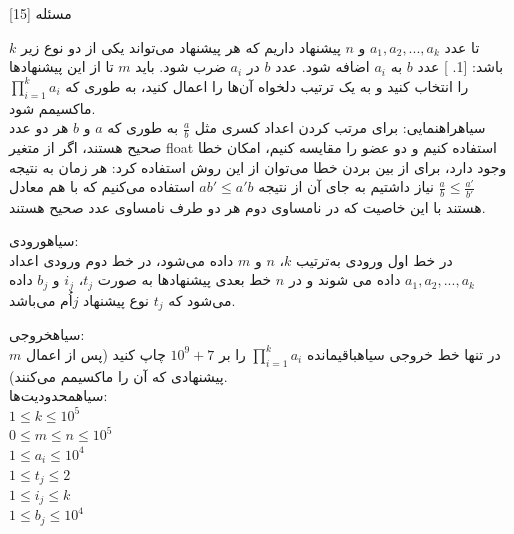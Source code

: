 ‌مسئله [15]

$k$ 
تا عدد $a_1,a_2,...,a_k$ و $n$ پیشنهاد داریم که هر پیشنهاد می‌تواند یکی از دو نوع زیر باشد:
[1. ]
 عدد $b$ به $a_i$ اضافه شود. 
 عدد $b$ در $a_i$ ضرب شود. 
باید
$m$
تا از این پیشنهاد‌ها را انتخاب کنید و به یک ترتیب دلخواه آن‌ها را اعمال کنید، به طوری که
$\prod_{i=1}^{k}a_i$
ماکسیمم شود.\\
‌سیاه{راهنمایی:} برای مرتب کردن اعداد کسری مثل 
$\frac{a}{b}$
به طوری که $a$ و $b$ هر دو عدد صحیح هستند، اگر از متغیر
float
استفاده کنیم و دو عضو را مقایسه کنیم، امکان خطا وجود دارد، برای از بین بردن خطا می‌توان از این روش استفاده کرد: هر زمان به نتیجه 
$\frac{a}{b}\leq \frac{a'}{b'}$
نیاز داشتیم به جای آن از نتیجه 
$ab'\leq a'b$
استفاده می‌کنیم که با هم معادل هستند با این خاصیت که در نامساوی دوم هر دو طرف نامساوی عدد صحیح هستند.

‌سیاه{ورودی:}\\
در خط اول ورودی به‌ترتیب $k$، $n$ و $m$ داده می‌شود، در خط دوم ورودی اعداد $a_1,a_2,...,a_k$ داده می شوند و در $n$ خط بعدی پیشنهادها به صورت 
$t_j$، $i_j$ و $b_j$ 
داده می‌شود که $t_j$ نوع پیشنهاد $j$اُم می‌باشد.

‌سیاه{خروجی:}\\
در تنها خط خروجی ‌سیاه{باقیمانده}
$\prod_{i=1}^{k}a_i$
را بر $10^9+7$ چاپ کنید (پس از اعمال $m$ پیشنهادی که آن را ماکسیمم می‌کنند).\\

‌سیاه{محدودیت‌ها:}\\
$1\leq k\leq 10^5$\\
$0\leq m\leq n\leq 10^5$\\
$1\leq a_i\leq 10^4$\\
$1\leq t_j\leq 2$\\
$1\leq i_j\leq k$\\
$1\leq b_j\leq 10^4$



